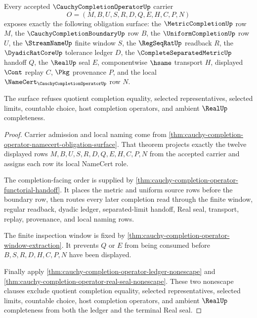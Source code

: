 \begin{theorem}
\label{thm:cauchycompletionoperator-obligation-surface}
Every accepted $\CauchyCompletionOperatorUp$ carrier
$$
O=(M,B,U,S,R,D,Q,E,H,C,P,N)
$$
exposes exactly the following obligation surface: the $\MetricCompletionUp$ row $M$, the $\CauchyCompletionBoundaryUp$ row $B$, the $\UniformCompletionUp$ row $U$, the $\StreamNameUp$ finite window $S$, the $\RegSeqRatUp$ readback $R$, the $\DyadicRatCoreUp$ tolerance ledger $D$, the $\CompleteSeparatedMetricUp$ handoff $Q$, the $\RealUp$ seal $E$, componentwise $\hsame$ transport $H$, displayed $\Cont$ replay $C$, $\Pkg$ provenance $P$, and the local $\NameCert_{\CauchyCompletionOperatorUp}$ row $N$.

The surface refuses quotient completion equality, selected representatives, selected limits, countable choice, host completion operators, and ambient $\RealUp$ completeness.
\end{theorem}
\begin{proof}
Carrier admission and local naming come from \autoref{thm:cauchy-completion-operator-namecert-obligation-surface}. That theorem projects exactly the twelve displayed rows $M,B,U,S,R,D,Q,E,H,C,P,N$ from the accepted carrier and assigns each row its local NameCert role.

The completion-facing order is supplied by \autoref{thm:cauchy-completion-operator-functorial-handoff}. It places the metric and uniform source rows before the boundary row, then routes every later completion read through the finite window, regular readback, dyadic ledger, separated-limit handoff, Real seal, transport, replay, provenance, and local naming rows.

The finite inspection window is fixed by \autoref{thm:cauchy-completion-operator-window-extraction}. It prevents $Q$ or $E$ from being consumed before $B,S,R,D,H,C,P,N$ have been displayed.

Finally apply \autoref{thm:cauchy-completion-operator-ledger-nonescape} and \autoref{thm:cauchy-completion-operator-real-seal-nonescape}. These two nonescape clauses exclude quotient completion equality, selected representatives, selected limits, countable choice, host completion operators, and ambient $\RealUp$ completeness from both the ledger and the terminal Real seal.
\end{proof}

